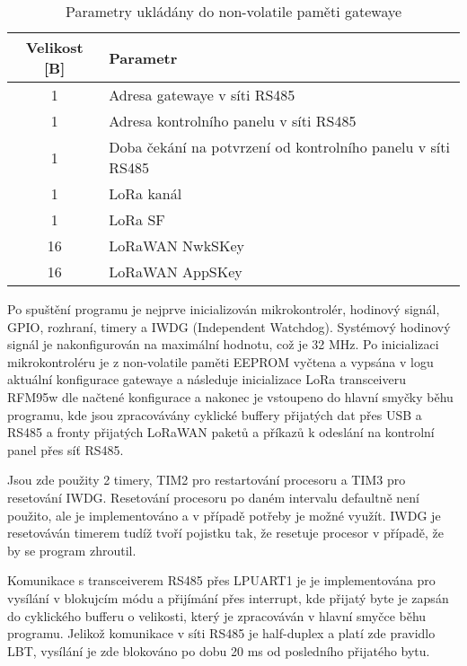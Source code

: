 \begin{longtable} { |c|p{7cm}| }
    \caption{Parametry ukládány do non-volatile paměti gatewaye} 
    \label{table:Parametry ukládány do non-volatile paměti gatewaye} \\
    \hline

    Velikost [B]          & Parametr           \\ \hline \hline
    1    & Adresa gatewaye v síti RS485       \\    \hline
    1    & Adresa kontrolního panelu v síti RS485       \\  \hline
    1    & Doba čekání na potvrzení od kontrolního panelu v síti RS485       \\ \hline
    1    & LoRa kanál       \\  \hline
    1    & LoRa SF       \\ \hline
    16    & LoRaWAN NwkSKey       \\ \hline
    16    & LoRaWAN AppSKey       \\ \hline

\end{longtable}

Po spuštění programu je nejprve inicializován mikrokontrolér, hodinový signál, GPIO, rozhraní, timery a IWDG (Independent Watchdog). Systémový hodinový signál je nakonfigurován na maximální hodnotu, což je 32 MHz. Po inicializaci mikrokontroléru je z non-volatile paměti EEPROM vyčtena a vypsána v logu aktuální konfigurace gatewaye a následuje inicializace LoRa transceiveru RFM95w dle načtené konfigurace a nakonec je vstoupeno do hlavní smyčky běhu programu, kde jsou zpracovávány cyklické buffery přijatých dat přes USB a RS485 a fronty přijatých LoRaWAN paketů a příkazů k odeslání na kontrolní panel přes síť RS485. 

Jsou zde použity 2 timery, TIM2 pro restartování procesoru a TIM3 pro resetování IWDG.
Resetování procesoru po daném intervalu defaultně není použito, ale je implementováno a v případě potřeby je možné využít. IWDG je resetováván timerem tudíž tvoří pojistku tak, že resetuje procesor v případě, že by se program zhroutil.

Komunikace s transceiverem RS485 přes LPUART1 je je implementována pro vysílání v blokujcím módu a přijímání přes interrupt, kde přijatý byte je zapsán do cyklického bufferu o velikosti, který je zpracováván v hlavní smyčce běhu programu. 
Jelikož komunikace v síti RS485 je half-duplex a platí zde pravidlo LBT, vysílání je zde blokováno po dobu 20 ms od posledního přijatého bytu.

